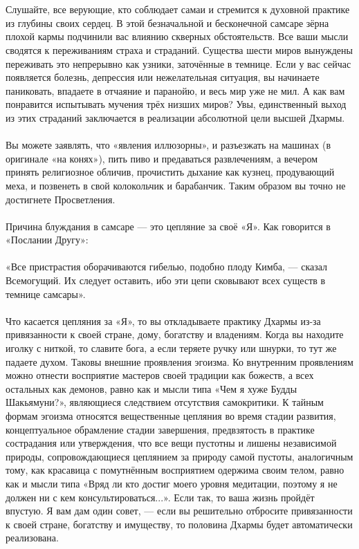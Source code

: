 \\ \\ Слушайте, все верующие, кто соблюдает самаи и стремится к духовной практике из глубины своих сердец. В этой безначальной и бесконечной самсаре зёрна плохой кармы подчинили вас влиянию скверных обстоятельств. Все ваши мысли сводятся к переживаниям страха и страданий. Существа шести миров вынуждены переживать это непрерывно как узники, заточённые в темнице. Если у вас сейчас появляется болезнь, депрессия или нежелательная ситуация, вы начинаете паниковать, впадаете в отчаяние и паранойю, и весь мир уже не мил. А как вам понравится испытывать мучения трёх низших миров? Увы, единственный выход из этих страданий заключается в реализации абсолютной цели высшей Дхармы.
\\ \\ Вы можете заявлять, что «явления иллюзорны», и разъезжать на машинах (в оригинале «на конях»), пить пиво и предаваться развлечениям, а вечером принять религиозное обличив, прочистить дыхание как кузнец, продувающий меха, и позвенеть в свой колокольчик и барабанчик. Таким образом вы точно не достигнете Просветления.
\\ \\ Причина блуждания в самсаре — это цепляние за своё «Я». Как говорится в «Послании Другу»:
\\ \\ «Все пристрастия оборачиваются гибелью, подобно плоду Кимба, — сказал Всемогущий. Их следует оставить, ибо эти цепи сковывают всех существ в темнице самсары».
\newpage
\\ \\ Что касается цепляния за «Я», то вы откладываете практику Дхармы из-за привязанности к своей стране, дому, богатству и владениям. Когда вы находите иголку с ниткой, то славите бога, а если теряете ручку или шнурки, то тут же падаете духом. Таковы внешние проявления эгоизма. Ко внутренним проявлениям можно отнести восприятие мастеров своей традиции как божеств, а всех остальных как демонов, равно как и мысли типа «Чем я хуже Будды Шакьямуни?», являющиеся следствием отсутствия самокритики. К тайным формам эгоизма относятся вещественные цепляния во время стадии развития, концептуальное обрамление стадии завершения, предвзятость в практике сострадания или утверждения, что все вещи пустотны и лишены независимой природы, сопровождающиеся цеплянием за природу самой пустоты, аналогичным тому, как красавица с помутнённым восприятием одержима своим телом, равно как и мысли типа «Вряд ли кто достиг моего уровня медитации, поэтому я не должен ни с кем консультироваться...». Если так, то ваша жизнь пройдёт впустую. Я вам дам один совет, — если вы решительно отбросите привязанности к своей стране, богатству и имуществу, то половина Дхармы будет автоматически реализована.
